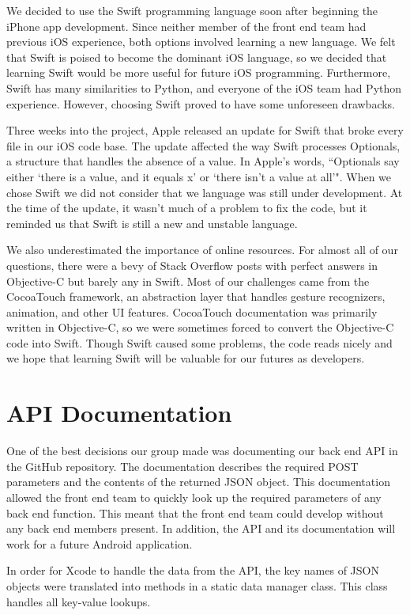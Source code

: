 \documentclass[12pt]{article}
\begin{document}
We decided to use the Swift programming language soon after beginning the iPhone app development.
Since neither member of the front end team had previous iOS experience, both options involved learning a new language.
We felt that Swift is poised to become the dominant iOS language,
so we decided that learning Swift would be more useful for future iOS programming.
Furthermore, Swift has many similarities to Python, and everyone of the iOS team had Python experience.
However, choosing Swift proved to have some unforeseen drawbacks. 

Three weeks into the project, Apple released an update for Swift that broke every file in our iOS code base. 
The update affected the way Swift processes Optionals, a structure that handles the absence of a value.
In Apple's words, ``Optionals say either `there is a value, and it equals x' or `there isn't a value at all'". 
When we chose Swift we did not consider that we language was still under development.
At the time of the update, it wasn't much of a problem to fix the code, 
but it reminded us that Swift is still a new and unstable language. 

We also underestimated the importance of online resources. 
For almost all of our questions, there were a bevy of Stack Overflow posts with perfect answers in Objective-C but barely any in Swift.
Most of our challenges came from the CocoaTouch framework, an abstraction layer that handles gesture recognizers, animation, and other UI features. 
CocoaTouch documentation was primarily written in Objective-C, so we were sometimes forced to convert the Objective-C code into Swift. 
Though Swift caused some problems, the code reads nicely and we hope that learning Swift will be valuable for our futures as developers.

\section{API Documentation}

One of the best decisions our group made was documenting our back end API in the GitHub repository. 
The documentation describes the required POST parameters and the contents of the returned JSON object. 
This documentation allowed the front end team to quickly look up the required parameters of any back end function. 
This meant that the front end team could develop without any back end members present.
In addition, the API and its documentation will work for a future Android application.

In order for Xcode to handle the data from the API, the key names of JSON objects were translated into methods in a static data manager class.
This class handles all key-value lookups. 
\end{document}
